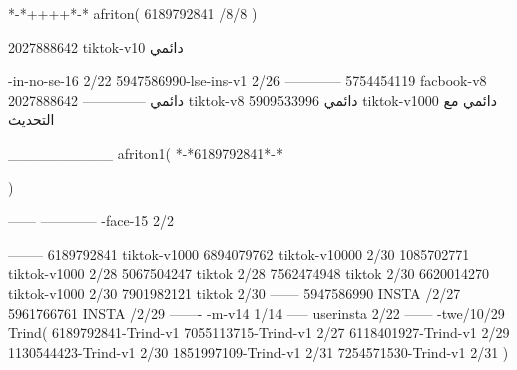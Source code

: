 *-*++++*-*
afriton(
6189792841 /8/8
)

2027888642 tiktok-v10
دائمي

-in-no-se-16 2/22
5947586990-lse-ins-v1 2/26
------------
5754454119 facbook-v8
دائمي
--------------
2027888642 tiktok-v8
دائمي
5909533996 tiktok-v1000
دائمي مع التحديث

__________
afriton1(
*-*6189792841*-*

)


------
------------
-face-15 2/2

--------
6189792841 tiktok-v1000
6894079762 tiktok-v10000 2/30
1085702771 tiktok-v1000 2/28
5067504247 tiktok 2/28
7562474948 tiktok 2/30
6620014270 tiktok-v1000 2/30
7901982121 tiktok 2/30
------
5947586990 INSTA /2/27
5961766761 INSTA /2/29
-------
-m-v14 1/14
-----
userinsta 2/22
------
-twe/10/29
Trind(
6189792841-Trind-v1 
7055113715-Trind-v1 2/27
6118401927-Trind-v1 2/29
1130544423-Trind-v1 2/30
1851997109-Trind-v1 2/31
7254571530-Trind-v1 2/31
)

